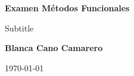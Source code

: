 \begin{titlepage}
   \begin{center}
       \vspace*{1cm}

       \textbf{Examen Métodos Funcionales}

       \vspace{0.5cm}
        Subtitle
            
       \vspace{1.5cm}

       \textbf{Blanca Cano Camarero}

       \vfill
            
       
            
       \vspace{0.8cm}
     
       
            
       \today
            
   \end{center}
\end{titlepage}